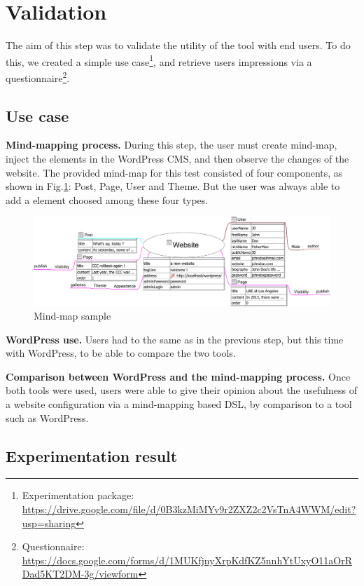 \section{Validation}\label{validation}

The aim of this step was to validate the utility of the tool with end users. To do this, we created a simple use case\footnote{\scriptsize{Experimentation package: \url{https://drive.google.com/file/d/0B3kzMiMYv9r2ZXZ2c2VsTnA4WWM/edit?usp=sharing}}}, and retrieve users impressions via a questionnaire\footnote{\scriptsize{Questionnaire: \url{https://docs.google.com/forms/d/1MUKfjnyXrpKdfKZ5nnhYtUxyO11aOrRDad5KT2DM-3g/viewform}}}.

\subsection{Use case}
\vspace{0.15em}
\noindent\textbf{Mind-mapping process.}
During this step, the user must create mind-map, inject the elements in the WordPress CMS, and then observe the changes of the website. The provided mind-map for this test consisted of four components, as shown in Fig.\ref{mindMapUseCase}: Post, Page, User and Theme. But the user was always able to add a element choosed among these four types.

			\begin{figure}[!h]
				\centering
				\includegraphics[width=\textwidth]{../resources/pdf/mindMapUseCase.pdf}
				\caption{Mind-map sample}
				\label{mindMapUseCase}
			\end{figure}

\vspace{0.15em}
\noindent\textbf{WordPress use.}
Users had to the same as in the previous step, but this time with WordPress, to be able to compare the two tools.

\vspace{0.15em}
\noindent\textbf{Comparison between WordPress and the mind-mapping process.}
Once both tools were used, users were able to give their opinion about the usefulness of a website configuration via a mind-mapping based DSL, by comparison to a tool such as WordPress.
	 
\subsection{Experimentation result}	 